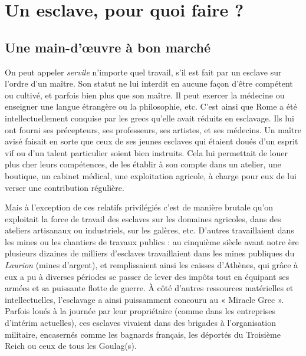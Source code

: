 \section{Un esclave, pour quoi faire ?}

\subsection{Une main-d'œuvre à bon marché}

On peut appeler \emph{servile} n'importe quel travail, s'il est fait par un esclave
sur l'ordre d'un maître. Son statut ne lui interdit en aucune façon
d'être compétent ou cultivé, et parfois bien plus que son maître. Il peut
exercer la médecine ou enseigner une langue étrangère ou la philosophie,
etc. C'est ainsi que Rome a été intellectuellement conquise par les grecs
qu'elle avait réduits en esclavage. Ils lui ont fourni ses précepteurs, ses
professeurs, ses artistes, et ses médecins. Un maître avisé faisait en sorte
que ceux de ses jeunes esclaves qui étaient doués d'un esprit vif ou d'un
talent particulier soient bien instruits. Cela lui permettait de louer plus
cher leurs compétences, de les établir à son compte dans un atelier, une
boutique, un cabinet médical, une exploitation agricole, à charge pour
eux de lui verser une contribution régulière.

Mais à l'exception de ces relatifs privilégiés c'est de manière brutale
qu'on exploitait la force de travail des esclaves sur les domaines agricoles,
dans des ateliers artisanaux ou industriels, sur les galères, etc. D'autres
travaillaient dans les mines ou les chantiers de travaux publics : au
cinquième siècle avant notre ère plusieurs dizaines de milliers d'esclaves
travaillaient dans les mines publiques du \emph{Laurion} (mines d'argent), et
remplissaient ainsi les caisses d'Athènes, qui grâce à eux a pu à diverses
périodes se passer de lever des impôts tout en équipant ses armées et sa
puissante flotte de guerre. À côté d'autres ressources matérielles et intellectuelles,
l'esclavage a ainsi puissamment concouru au « Miracle Grec ».
Parfois loués à la journée par leur propriétaire (comme dans les entreprises
d'intérim actuelles), ces esclaves vivaient dans des brigades à l'organisation
militaire, encasernés comme les bagnards français, les déportés du
Troisième Reich ou ceux de tous les Goulag(s).

